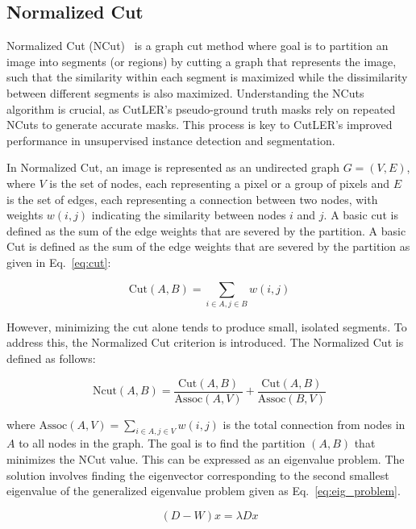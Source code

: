 \subsection{Normalized Cut}
Normalized Cut (NCut)~\cite{normcut} is a graph cut method where goal is to partition an image into segments (or regions) by cutting a graph that represents the image, such that the similarity within each segment is maximized while the dissimilarity between different segments is also maximized. Understanding the NCuts algorithm is crucial, as CutLER's pseudo-ground truth masks rely on repeated NCuts to generate accurate masks. This process is key to CutLER's improved performance in unsupervised instance detection and segmentation.

In Normalized Cut, an image is represented as an undirected graph \( G = (V, E) \), where \( V \) is the set of nodes, each representing a pixel or a group of pixels and \( E \) is the set of edges, each representing a connection between two nodes, with weights \( w(i, j) \) indicating the similarity between nodes \( i \) and \( j \). A basic cut is defined as the sum of the edge weights that are severed by the partition. A basic Cut is defined as the sum of the edge weights that are severed by the partition as given in Eq.~\ref{eq:cut}:

\begin{equation}
	\label{eq:cut}
	\text{Cut}(A, B) = \sum_{i \in A, j \in B} w(i, j)
\end{equation}

However, minimizing the cut alone tends to produce small, isolated segments. To address this, the Normalized Cut criterion is introduced. The Normalized Cut is defined as follows:

\begin{equation}
	\label{eq:norm_cut}
	\text{Ncut}(A, B) = \frac{\text{Cut}(A, B)}{\text{Assoc}(A, V)} + \frac{\text{Cut}(A, B)}{\text{Assoc}(B, V)}
\end{equation}

where \( \text{Assoc}(A, V) = \sum_{i \in A, j \in V} w(i, j) \) is the total connection from nodes in \( A \) to all nodes in the graph. The goal is to find the partition \( (A, B) \) that minimizes the NCut value. This can be expressed as an eigenvalue problem. The solution involves finding the eigenvector corresponding to the second smallest eigenvalue of the generalized eigenvalue problem given as Eq.~\ref{eq:eig_problem}.

\begin{equation}
	\label{eq:eig_problem}
	(D - W)x = \lambda D x
\end{equation}

